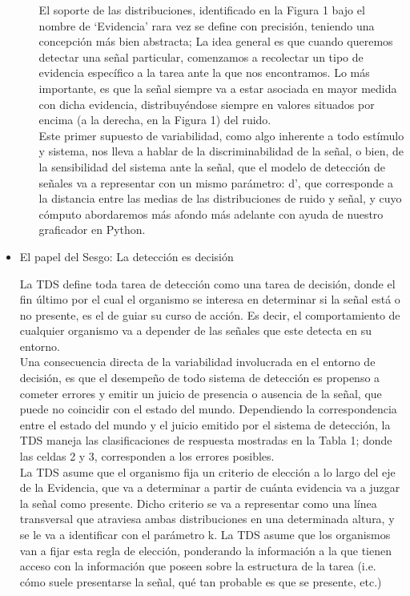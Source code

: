 \begin{itemize}
\begin{itemize}
El soporte de las distribuciones, identificado en la Figura 1 bajo el nombre de ‘Evidencia’ rara vez se define con precisión,  teniendo una concepción más bien abstracta; La idea general es que cuando queremos detectar una señal particular, comenzamos a recolectar un tipo de evidencia específico a la tarea ante la que nos encontramos. Lo más importante, es que la señal siempre va a estar asociada en mayor medida con dicha evidencia, distribuyéndose siempre en valores situados por encima (a la derecha, en la Figura 1) del ruido.\\


Este primer supuesto de variabilidad, como algo inherente a todo estímulo y sistema, nos lleva a hablar de la discriminabilidad de la señal, o bien, de la sensibilidad del sistema ante la señal, que el modelo de detección de señales va a representar con un mismo parámetro: d’, que corresponde a la distancia entre las medias de las distribuciones de ruido y señal, y cuyo cómputo abordaremos más afondo más adelante con ayuda de nuestro graficador en Python.\\ 

     \end{itemize}
  \item{El papel del Sesgo: La detección es decisión}

La TDS define toda tarea de detección como una tarea de decisión, donde el fin último por el cual el organismo se interesa en determinar si la señal está o no presente, es el de guiar su curso de acción. Es decir, el comportamiento de cualquier organismo va a depender de las señales que este detecta en su entorno.\\

Una consecuencia directa de la variabilidad involucrada en el entorno de decisión, es que el desempeño de todo sistema de detección es propenso a cometer errores y emitir un juicio de presencia o ausencia de la señal, que puede no coincidir con el estado del mundo. Dependiendo la correspondencia entre el estado del mundo y el juicio emitido por el sistema de detección, la TDS maneja las clasificaciones de respuesta mostradas en la Tabla 1; donde las celdas 2 y 3, corresponden a los errores posibles.\\

La TDS asume que el organismo fija un criterio de elección a lo largo del eje de la Evidencia, que va a determinar a partir de cuánta evidencia va a juzgar la señal como presente. Dicho criterio se va a representar como una línea transversal que atraviesa ambas distribuciones en una determinada altura, y se le va a identificar con el parámetro k. La TDS asume que los organismos van a fijar esta regla de elección, ponderando la información a la que tienen acceso con la información que poseen sobre la estructura de la tarea (i.e. cómo suele presentarse la señal, qué tan probable es que se presente, etc.)\\


\end{itemize}
